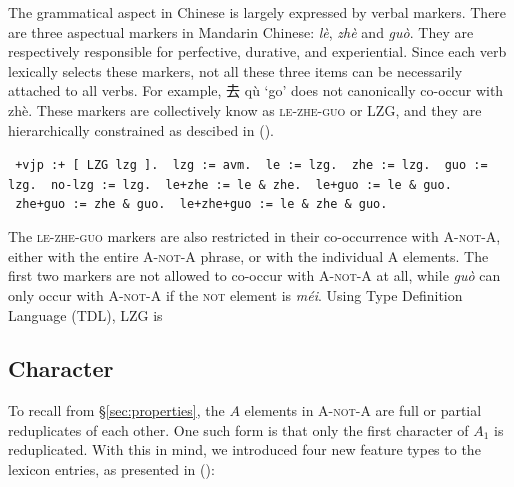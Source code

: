 \documentclass[11pt]{article}
\def\anota{\textsc{A-not-A}}
\def\aone{$A_1$}
\newcommand{\myref}[1]{(\getref{#1})}
\begin{document}
\noindent The grammatical aspect in Chinese is largely expressed by
verbal markers. There are three aspectual markers in Mandarin Chinese:
 \textit{l\`{e}}, 
\textit{zh\`{e}} and  \textit{gu\`{o}}. They are
respectively responsible for perfective, durative, and experiential.
Since each verb lexically selects these markers, not all these three
items can be necessarily attached to all verbs. For example, 去 q\`{u}
`go' does not canonically co-occur with zh\`{e}. These markers are
collectively know as \textsc{le-zhe-guo} or LZG, and they are
hierarchically constrained as descibed in \myref{tdl:lzg}. 

{\small 
{}
\texttt{
+vjp :+ [ LZG lzg ].\newline
\mbox{ }lzg := avm. \newline
\mbox{ }le := lzg.\newline
\mbox{ }zhe := lzg.\newline
\mbox{ }guo := lzg.\newline
\mbox{ }no-lzg := lzg.\newline
\mbox{ }le+zhe := le \& zhe.\newline
\mbox{ }le+guo := le \& guo.\newline
\mbox{ }zhe+guo := zhe \& guo.\newline
\mbox{ }le+zhe+guo := le \& zhe \& guo.}
\xe}
\vspace{-20pt}

The \textsc{le-zhe-guo} markers are also restricted in their
co-occurrence with \anota, either with the entire {\anota} phrase, or
with the individual \textsc{A} elements. The first two markers are not
allowed to co-occur with {\anota} at all, while \textit{gu\`{o}} can
only occur with {\anota} if the \textsc{not} element is
 \textit{m\'{e}i}. Using Type Definition Language
(TDL), LZG is 





\subsection{Character}
\label{ssec:char}

To recall from \S\ref{sec:properties}, the $A$ elements in {\anota} are
full or partial reduplicates of each other. One such form is that only
the first character of {\aone}  is reduplicated. With this in mind, we
introduced four new feature types to the lexicon entries, as presented
in ():
\end{document}
